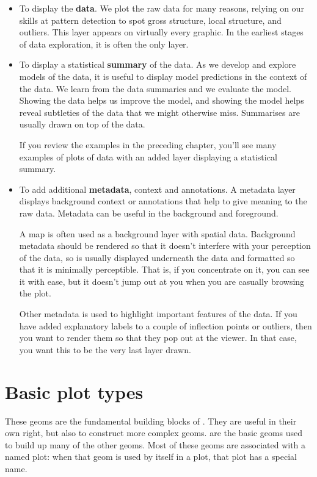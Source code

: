 \begin{itemize}
  \item To display the {\bf data}.  We plot the raw data for many reasons, relying on our skills at pattern detection to spot gross structure, local structure, and outliers.  This layer appears on virtually every graphic.  In the earliest stages of data exploration, it is often the only layer.

  \item To display a statistical {\bf summary} of the data. As we develop and explore models of the data, it is useful to display model predictions in the context of the data. We learn from the data summaries and we evaluate the model. Showing the data helps us improve the model, and showing the model helps reveal subtleties of the data that we might otherwise miss. Summarises are usually drawn on top of the data.

  If you review the examples in the preceding chapter, you'll see many examples of plots of data with an added layer displaying a statistical summary.

  \item To add additional {\bf metadata}, context and annotations. A metadata layer displays background context or annotations that help to give meaning to the raw data.  Metadata can be useful in the background and foreground.
  
  A map is often used as a background layer with spatial data. Background metadata should be rendered so that it doesn't interfere with your perception of the data, so is usually displayed underneath the data and formatted so that it is minimally perceptible. That is, if you concentrate on it, you can see it with ease, but it doesn't jump out at you when you are casually browsing the plot.

  Other metadata is used to highlight important features of the data. If you have added explanatory labels to a couple of inflection points or outliers, then you want to render them so that they pop out at the viewer. In that case, you want this to be the very last layer drawn.

\end{itemize}


\section{Basic plot types}\label{sec:basics}

These geoms are the fundamental building blocks of \ggplot.  They are useful in their own right, but also to construct more complex geoms.  are the basic geoms used to build up many of the other geoms.  Most of these geoms are associated with a named plot: when that geom is used by itself in a plot, that plot has a special name.


